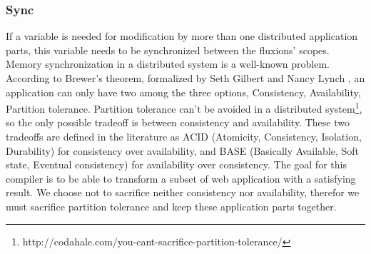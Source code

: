 \subsubsection{Sync}

If a variable is needed for modification by more than one distributed application parts, this variable needs to be synchronized between the fluxions' scopes.
Memory synchronization in a distributed system is a well-known problem.
According to Brewer's theorem, formalized by Seth Gilbert and Nancy Lynch \cite{Gilbert2002}, an application can only have two among the three options, Consistency, Availability, Partition tolerance.
Partition tolerance can't be avoided in a distributed system\footnote{http://codahale.com/you-cant-sacrifice-partition-tolerance/}, so the only possible tradeoff is between consistency and availability.
These two tradeoffs are defined in the literature as ACID (Atomicity, Consistency, Isolation, Durability) for consistency over availability, and BASE (Basically Available, Soft state, Eventual consistency)\cite{Fox1997} for availability over consistency.
The goal for this compiler is to be able to transform a subset of web application with a satisfying result.
We choose not to sacrifice neither consistency nor availability, therefor we must sacrifice partition tolerance and keep these application parts together.

